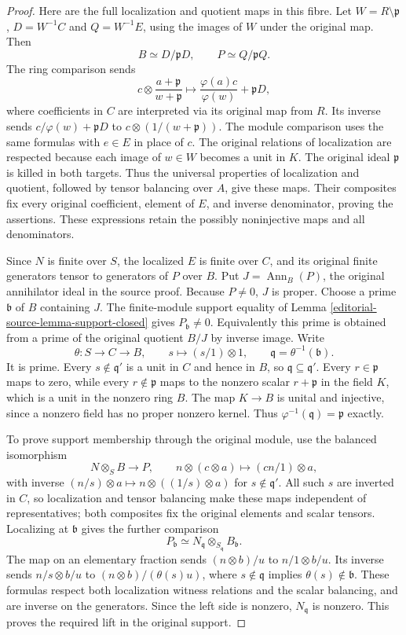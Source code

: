 \begin{proof}
Here are the full localization and quotient maps
in this fibre. Let $W=R\setminus\mathfrak p$,
$D=W^{-1}C$ and $Q=W^{-1}E$, using the images of
$W$ under the original map. Then
$$
B\simeq D/\mathfrak pD,\qquad
P\simeq Q/\mathfrak pQ.
$$
The ring comparison sends
$$
c\otimes\frac{a+\mathfrak p}{w+\mathfrak p}
\longmapsto\frac{\varphi(a)c}{\varphi(w)}+\mathfrak pD,
$$
where coefficients in $C$ are interpreted via its
original map from $R$. Its inverse sends
$c/\varphi(w)+\mathfrak pD$ to
$c\otimes(1/(w+\mathfrak p))$.
The module comparison uses the same formulas
with $e\in E$ in place of $c$. The original
relations of localization are respected because
each image of $w\in W$ becomes a unit in $K$.
The original ideal $\mathfrak p$ is killed in
both targets. Thus the universal properties of
localization and quotient, followed by tensor
balancing over $A$, give these maps. Their
composites fix every original coefficient,
element of $E$, and inverse denominator, proving
the assertions. These expressions retain the
possibly noninjective maps and all denominators.

Since $N$ is finite over $S$, the localized
$E$ is finite over $C$, and its original finite
generators tensor to generators of $P$ over $B$.
Put $J=\operatorname{Ann}_B(P)$, the original
annihilator ideal in the source proof.
Because $P\ne0$, $J$ is proper. Choose a prime
$\mathfrak b$ of $B$ containing $J$.
The finite-module support equality of
Lemma \ref{editorial-source-lemma-support-closed} gives
$P_{\mathfrak b}\ne0$.
Equivalently this prime is obtained from a prime
of the original quotient $B/J$ by inverse image.
Write
$$
\theta:S\longrightarrow C\longrightarrow B,
\qquad s\longmapsto (s/1)\otimes1,
\qquad \mathfrak q=\theta^{-1}(\mathfrak b).
$$
It is prime. Every $s\notin\mathfrak q'$ is a
unit in $C$ and hence in $B$, so
$\mathfrak q\subseteq\mathfrak q'$.
Every $r\in\mathfrak p$ maps to zero, while
every $r\notin\mathfrak p$ maps to the nonzero
scalar $r+\mathfrak p$ in the field $K$, which
is a unit in the nonzero ring $B$. The map
$K\to B$ is unital and injective, since a
nonzero field has no proper nonzero kernel.
Thus
$\varphi^{-1}(\mathfrak q)=\mathfrak p$ exactly.

To prove support membership through the original
module, use the balanced isomorphism
$$
N\otimes_SB\longrightarrow P,
\qquad n\otimes(c\otimes a)\longmapsto(cn/1)\otimes a,
$$
with inverse $(n/s)\otimes a\mapsto
n\otimes((1/s)\otimes a)$ for $s\notin\mathfrak q'$.
All such $s$ are inverted in $C$, so localization
and tensor balancing make these maps independent
of representatives; both composites fix the
original elements and scalar tensors. Localizing
at $\mathfrak b$ gives the further comparison
$$
P_{\mathfrak b}\simeq
N_{\mathfrak q}\otimes_{S_{\mathfrak q}}B_{\mathfrak b}.
$$
The map on an elementary fraction sends
$(n\otimes b)/u$ to $n/1\otimes b/u$.
Its inverse sends $n/s\otimes b/u$ to
$(n\otimes b)/(\theta(s)u)$, where
$s\notin\mathfrak q$ implies
$\theta(s)\notin\mathfrak b$. These formulas
respect both localization witness relations and
the scalar balancing, and are inverse on the
generators. Since the left side is nonzero,
$N_{\mathfrak q}$ is nonzero. This proves the
required lift in the original support.


\end{proof}
